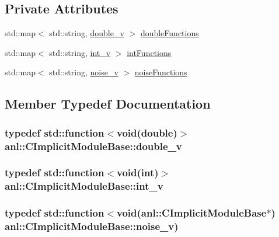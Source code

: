 \subsection*{Private Attributes}
\begin{DoxyCompactItemize}
\item 
std::map$<$ std::string, \hyperlink{classanl_1_1CImplicitModuleBase_a32d06aeb408b2063f45ad8c1d455e16c}{double\_\-v} $>$ \hyperlink{classanl_1_1CImplicitModuleBase_a44d78c30f32d9def6ad5a28f3831e5cb}{doubleFunctions}
\item 
std::map$<$ std::string, \hyperlink{classanl_1_1CImplicitModuleBase_a0af03005949051c16a5c063dd73b5eb8}{int\_\-v} $>$ \hyperlink{classanl_1_1CImplicitModuleBase_a6b667cd64feb2e8345fcf68eadc565e3}{intFunctions}
\item 
std::map$<$ std::string, \hyperlink{classanl_1_1CImplicitModuleBase_a29276d273677a9928320cfb6118de3ba}{noise\_\-v} $>$ \hyperlink{classanl_1_1CImplicitModuleBase_abeee324fb88e1ea014ac6595b9a98d16}{noiseFunctions}
\end{DoxyCompactItemize}


\subsection{Member Typedef Documentation}
\hypertarget{classanl_1_1CImplicitModuleBase_a32d06aeb408b2063f45ad8c1d455e16c}{
\subsubsection[{double\_\-v}]{\setlength{\rightskip}{0pt plus 5cm}typedef std::function$<$void(double)$>$ {\bf anl::CImplicitModuleBase::double\_\-v}}}
\label{classanl_1_1CImplicitModuleBase_a32d06aeb408b2063f45ad8c1d455e16c}
\hypertarget{classanl_1_1CImplicitModuleBase_a0af03005949051c16a5c063dd73b5eb8}{
\subsubsection[{int\_\-v}]{\setlength{\rightskip}{0pt plus 5cm}typedef std::function$<$void(int)$>$ {\bf anl::CImplicitModuleBase::int\_\-v}}}
\label{classanl_1_1CImplicitModuleBase_a0af03005949051c16a5c063dd73b5eb8}
\hypertarget{classanl_1_1CImplicitModuleBase_a29276d273677a9928320cfb6118de3ba}{
\subsubsection[{noise\_\-v}]{\setlength{\rightskip}{0pt plus 5cm}typedef std::function$<$void({\bf anl::CImplicitModuleBase}$\ast$) {\bf anl::CImplicitModuleBase::noise\_\-v})}}
\label{classanl_1_1CImplicitModuleBase_a29276d273677a9928320cfb6118de3ba}



